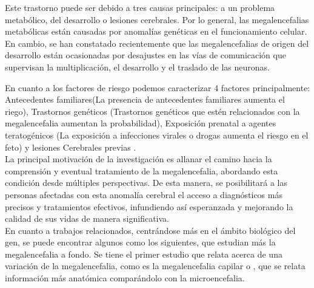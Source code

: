 Este trastorno puede ser debido a tres causas principales: a un problema metabólico, del desarrollo o lesiones cerebrales. Por lo general, las megalencefalias metabólicas están causadas por anomalías genéticas en el funcionamiento celular. En cambio, se han constatado recientemente \cite{winden_megalencephaly_2015} que las megalencefalias de origen del desarrollo están ocasionadas por desajustes en las vías de comunicación que supervisan la multiplicación, el desarrollo y el traslado de las neuronas.

En cuanto a los factores de riesgo podemos caracterizar 4 factores principalmente: Antecedentes familiares(La presencia de antecedentes familiares aumenta el riego), Trastornos genéticos (Trastornos genéticos que estén relacionados con la megalencefalia aumentan la probabilidad), Exposición prenatal a agentes teratogénicos (La exposición a infecciones virales o drogas aumenta el riesgo en el feto) y lesiones Cerebrales previas \cite{winden_megalencephaly_2015}. \\

La principal motivación de la investigación es allanar el camino hacia la comprensión y eventual tratamiento de la megalencefalia, abordando esta condición desde múltiples perspectivas. De esta manera, se posibilitará a las personas afectadas con esta anomalía cerebral el acceso a diagnósticos más precisos y tratamientos efectivos, infundiendo así esperanzada y mejorando la calidad de sus vidas de manera significativa.\\


En cuanto a trabajos relacionados, centrándose más en el ámbito biológico del gen, se puede encontrar algunos como los siguientes, que estudian más la megalencefalia a fondo. Se tiene el primer estudio que relata acerca de una variación de la megalencefalia, como es la megalencefalia capilar \cite{mirzaa_megalencephaly-capillary_2012} o \cite{pirozzi_microcephaly_2018}, que se relata información más anatómica comparándolo con la microencefalia.
